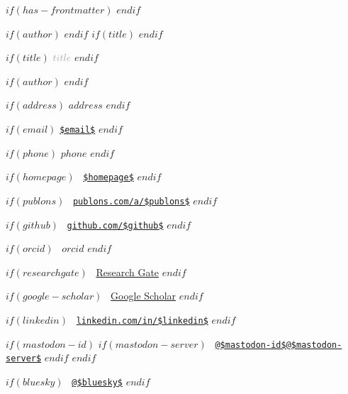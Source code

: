 $if(has-frontmatter)$
\frontmatter
$endif$

\fancyhead{}
$if(author)$
$endif$
$if(title)$
$endif$

\pagestyle{fancy}
\thispagestyle{plain}

$if(title)$
{\large\textcolor{darkgray}{$title$}}\smallskip
$endif$

$if(author)$
\smallskip
$endif$


\baselineskip

\begin{minipage}[t]{0.5\textwidth}
  $if(address)$
  \small\noindent $address$
  $endif$

  $if(email)$
  \href{mailto:$email$}{\nolinkurl{$email$}}
  $endif$

  $if(phone)$
  \href{tel:$phone$}{$phone$}
  $endif$
\end{minipage}%
\begin{minipage}[t]{0.5\textwidth}
  \raggedleft\small

  $if(homepage)$
  {\faHouse}\,
  \href{$homepage$}{\nolinkurl{$homepage$}}
  $endif$

  $if(publons)$
  {\aiPublons}\, 
  \href{https://publons.com/a/$publons$}{\nolinkurl{publons.com/a/$publons$}}
  $endif$

  $if(github)$
  {\faGithub}\,
  \href{https://github.com/$github$}{\nolinkurl{github.com/$github$}}
  $endif$

  $if(orcid)$
  {\aiOrcid}\,
  \href{https://orcid.org/$orcid$}{$orcid$}
  $endif$

  $if(researchgate)$
  {\aiResearchGate}\, 
  \href{https://www.researchgate.net/profile/$researchgate$}{Research Gate}
  $endif$

  $if(google-scholar)$
  {\aiGoogleScholar}\, \href{https://scholar.google.com/citations?user=$google-scholar$}{Google Scholar}
  $endif$

  $if(linkedin)$
  {\faLinkedin}\,
  \href{https://www.linkedin.com/in/$linkedin$}{\nolinkurl{linkedin.com/in/$linkedin$}}
  $endif$

  $if(mastodon-id)$
  $if(mastodon-server)$
  {\faMastodon}\,
  \href{https://$mastodon-server$/@$mastodon-id$}{\nolinkurl{@$mastodon-id$@$mastodon-server$}}
  $endif$
  $endif$

  $if(bluesky)$
  {\faBluesky}\,
  \href{https://bsky.app/profile/$bluesky$}{\nolinkurl{@$bluesky$}}
  $endif$
\end{minipage}
